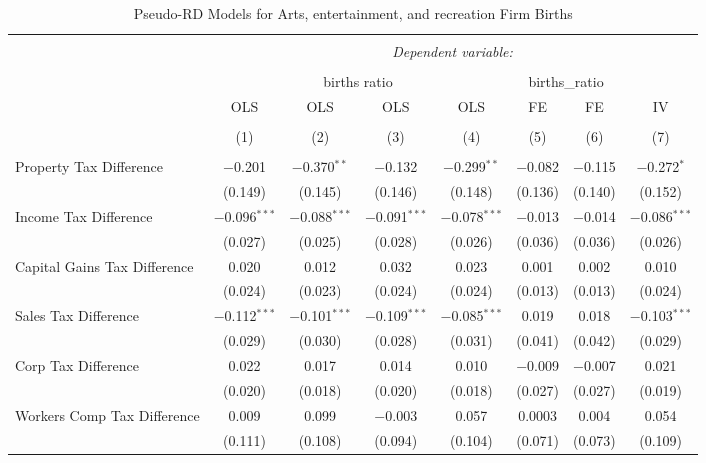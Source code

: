 
\begin{table}[!htbp] \centering 
  \caption{Pseudo-RD Models for  Arts, entertainment, and recreation Firm Births} 
  \label{} 
\begin{tabular}{@{\extracolsep{5pt}}lccccccc} 
\\[-1.8ex]\hline 
\hline \\[-1.8ex] 
 & \multicolumn{7}{c}{\textit{Dependent variable:}} \\ 
\cline{2-8} 
\\[-1.8ex] & \multicolumn{4}{c}{births ratio} & \multicolumn{2}{c}{births\_ratio} &   \\ 
 & OLS & OLS & OLS & OLS & FE & FE & IV \\ 
\\[-1.8ex] & (1) & (2) & (3) & (4) & (5) & (6) & (7)\\ 
\hline \\[-1.8ex] 
 Property Tax Difference & $-$0.201 & $-$0.370$^{**}$ & $-$0.132 & $-$0.299$^{**}$ & $-$0.082 & $-$0.115 & $-$0.272$^{*}$ \\ 
  & (0.149) & (0.145) & (0.146) & (0.148) & (0.136) & (0.140) & (0.152) \\ 
  Income Tax Difference & $-$0.096$^{***}$ & $-$0.088$^{***}$ & $-$0.091$^{***}$ & $-$0.078$^{***}$ & $-$0.013 & $-$0.014 & $-$0.086$^{***}$ \\ 
  & (0.027) & (0.025) & (0.028) & (0.026) & (0.036) & (0.036) & (0.026) \\ 
  Capital Gains Tax Difference & 0.020 & 0.012 & 0.032 & 0.023 & 0.001 & 0.002 & 0.010 \\ 
  & (0.024) & (0.023) & (0.024) & (0.024) & (0.013) & (0.013) & (0.024) \\ 
  Sales Tax Difference & $-$0.112$^{***}$ & $-$0.101$^{***}$ & $-$0.109$^{***}$ & $-$0.085$^{***}$ & 0.019 & 0.018 & $-$0.103$^{***}$ \\ 
  & (0.029) & (0.030) & (0.028) & (0.031) & (0.041) & (0.042) & (0.029) \\ 
  Corp Tax Difference & 0.022 & 0.017 & 0.014 & 0.010 & $-$0.009 & $-$0.007 & 0.021 \\ 
  & (0.020) & (0.018) & (0.020) & (0.018) & (0.027) & (0.027) & (0.019) \\ 
  Workers Comp Tax Difference & 0.009 & 0.099 & $-$0.003 & 0.057 & 0.0003 & 0.004 & 0.054 \\ 
  & (0.111) & (0.108) & (0.094) & (0.104) & (0.071) & (0.073) & (0.109) \\ 

\end{tabular}
\end{table}
